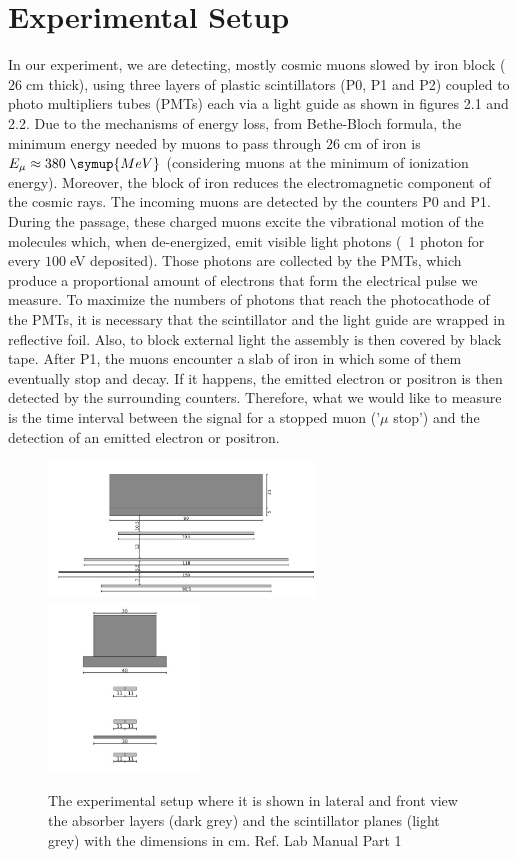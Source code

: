 \chapter{Experimental Setup}
\label{sec:setup}
	In our experiment, we are detecting, mostly cosmic muons slowed by iron block ($26\;$cm thick),
	using three layers of plastic scintillators (P0, P1 and P2) coupled to photo multipliers tubes (PMTs) each via a light guide as shown in figures 2.1 and 2.2.
	Due to the mechanisms of energy loss, from Bethe-Bloch formula, the minimum energy needed by muons to pass through 
	$26\;$cm of iron is $E_{\mu} \approx 380 \; \symup{MeV}$ (considering muons at the minimum of ionization energy).
	 Moreover, the block of iron reduces the electromagnetic component of the cosmic rays.
	The incoming muons are detected by the counters P0 and P1.
	During the passage, these charged muons excite the vibrational motion of the molecules which, when de-energized, 
	emit visible light photons  (~1 photon for every $100\;$eV deposited). Those photons are collected by the PMTs, which
	produce a proportional amount of electrons that form the electrical pulse we measure.
	To maximize the numbers of photons that reach the photocathode of the PMTs, it is 
	necessary that the scintillator and the light guide are wrapped in reflective foil. Also, to block
	external light the assembly is then covered by black tape.
	After P1, the muons encounter a slab of iron in which some of them eventually stop and decay. If it happens,
	the emitted electron or positron is then detected by the surrounding counters. Therefore,
	what we would like to measure is the time interval between the signal for a stopped muon (’$\mu$ stop’) and the
	detection of an emitted electron or positron.
	\begin{figure}
		\centering
		\includegraphics[width=0.63\textwidth]{figures/11.png}
		\includegraphics[width=0.36\textwidth]{figures/22.png}
		\caption{The experimental setup where it is shown in lateral and front view the absorber layers (dark grey) and the scintillator planes (light grey) with the dimensions in cm. Ref. Lab Manual Part 1}
		\label{fig:Scintillators_Detectors}
	\end{figure}
